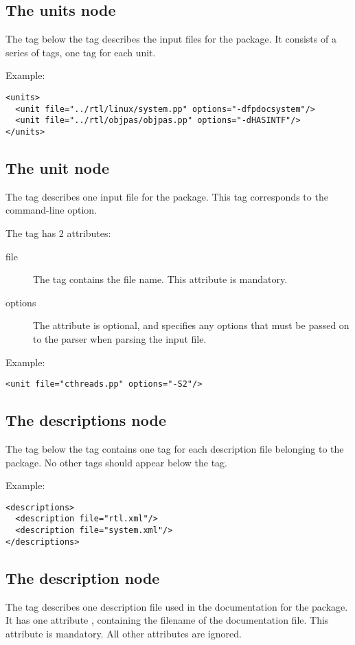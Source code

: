 \subsection{The units node}
\label{project:units}
The  tag below the  tag describes the input files for 
the package. It consists of a series of  tags, one tag for each unit.

Example:
\begin{verbatim}
<units>
  <unit file="../rtl/linux/system.pp" options="-dfpdocsystem"/>
  <unit file="../rtl/objpas/objpas.pp" options="-dHASINTF"/>
</units>
\end{verbatim}

\subsection{The unit node}
\label{project:unit}
The  tag describes one input file for the package. 
This tag corresponds to the  command-line option.

The tag has 2 attributes: 
\begin{description}
\item[file] The  tag contains the file name. This attribute is
mandatory.
\item[options] The  attribute is optional, and specifies 
any options that must be passed on to the parser when parsing the input file.
\end{description}

Example:
\begin{verbatim}
<unit file="cthreads.pp" options="-S2"/>
\end{verbatim}

\subsection{The descriptions node}
\label{project:descriptions}
The  tag below the  tag contains one 
 tag for each description file belonging to the package.
No other tags should appear below the  tag.

Example:
\begin{verbatim}
<descriptions>
  <description file="rtl.xml"/>
  <description file="system.xml"/>
</descriptions>
\end{verbatim}


\subsection{The description node}
\label{project:description}
The  tag describes one description file used in the
documentation for the package. It has one attribute , containing
the filename of the documentation file. This attribute is mandatory. All
other attributes are ignored.

